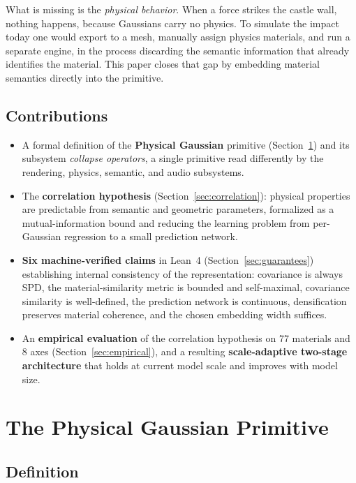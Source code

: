 \documentclass[twoside,11pt]{article}
\begin{document}
What is missing is the \emph{physical behavior}. When a force strikes the castle wall, nothing happens, because Gaussians carry no physics. To simulate the impact today one would export to a mesh, manually assign physics materials, and run a separate engine, in the process discarding the semantic information that already identifies the material. This paper closes that gap by embedding material semantics directly into the primitive.

\subsection{Contributions}

\begin{itemize}
\item A formal definition of the \textbf{Physical Gaussian} primitive (Section~\ref{sec:primitive}) and its subsystem \emph{collapse operators}, a single primitive read differently by the rendering, physics, semantic, and audio subsystems.
\item The \textbf{correlation hypothesis} (Section~\ref{sec:correlation}): physical properties are predictable from semantic and geometric parameters, formalized as a mutual-information bound and reducing the learning problem from per-Gaussian regression to a small prediction network.
\item \textbf{Six machine-verified claims} in Lean~4 (Section~\ref{sec:guarantees}) establishing internal consistency of the representation: covariance is always SPD, the material-similarity metric is bounded and self-maximal, covariance similarity is well-defined, the prediction network is continuous, densification preserves material coherence, and the chosen embedding width suffices.
\item An \textbf{empirical evaluation} of the correlation hypothesis on 77 materials and 8 axes (Section~\ref{sec:empirical}), and a resulting \textbf{scale-adaptive two-stage architecture} that holds at current model scale and improves with model size.
\end{itemize}

\section{The Physical Gaussian Primitive}
\label{sec:primitive}

\subsection{Definition}
\end{document}

